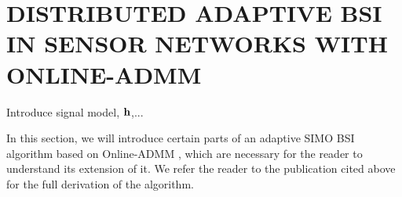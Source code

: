 \documentclass{article}
\begin{document}



\section{DISTRIBUTED ADAPTIVE BSI IN SENSOR NETWORKS WITH ONLINE-ADMM}
\label{sec:dbsi}
\begin{todo}
  Introduce signal model, \(\bm{\mathrm{h}}\),...
\end{todo}
In this section, we will introduce certain parts of an adaptive SIMO BSI algorithm based on Online-ADMM \cite{blochbergerDBSI}, which are necessary for the reader to understand its extension of it.
We refer the reader to the publication cited above for the full derivation of the algorithm.
\end{document}
